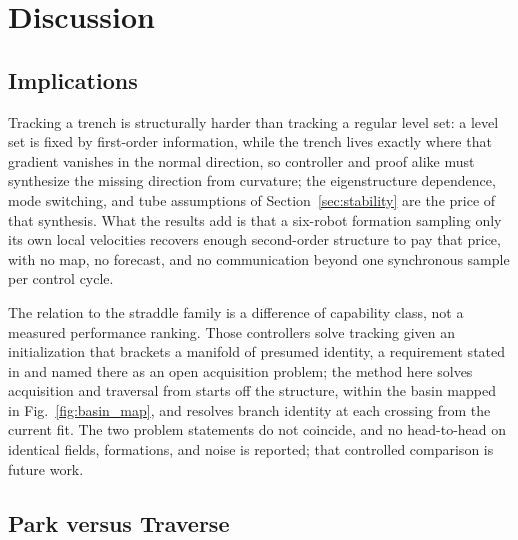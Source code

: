 \documentclass[lettersize,journal]{IEEEtran}
\begin{document}
\section{Discussion}
\label{sec:discussion}

\subsection{Implications}
\label{sec:prior_comparison}

Tracking a trench is structurally harder than tracking a regular level
set: a level set is fixed by first-order information, while the trench
lives exactly where that gradient vanishes in the normal direction, so
controller and proof alike must synthesize the missing direction from
curvature; the eigenstructure dependence, mode switching, and tube
assumptions of Section~\ref{sec:stability} are the price of that
synthesis. What the results add is that a six-robot formation sampling
only its own local velocities recovers enough second-order structure
to pay that price, with no map, no forecast, and no communication
beyond one synchronous sample per control cycle.

The relation to the straddle family \cite{9,10,11} is a difference of
capability class, not a measured performance ranking. Those
controllers solve tracking given an initialization that brackets a
manifold of presumed identity, a requirement stated in \cite{9} and
named there as an open acquisition problem; the method here solves
acquisition and traversal from starts off the structure, within the
basin mapped in Fig.~\ref{fig:basin_map}, and resolves
branch identity at each crossing from the current fit. The two problem
statements do not coincide, and no head-to-head on identical fields,
formations, and noise is reported; that controlled comparison is
future work.

\subsection{Park versus Traverse}
\label{sec:park_vs_traverse}
\end{document}
